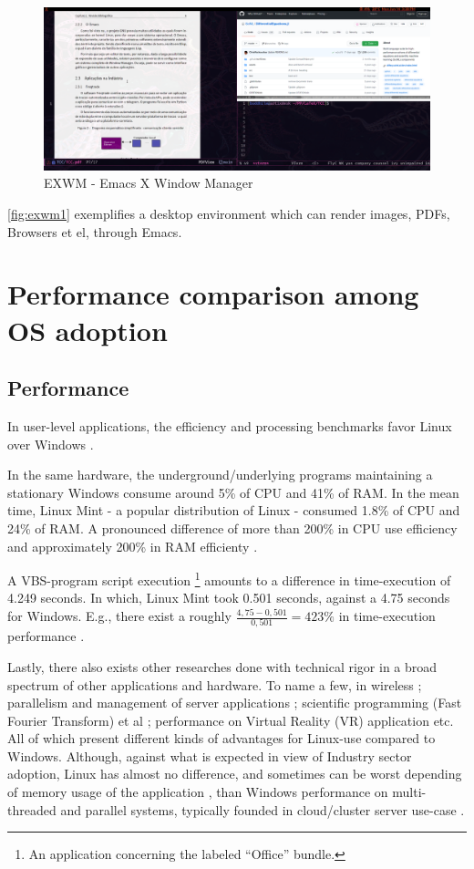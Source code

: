 \documentclass[
12pt,				%
openright,			%
oneside,			%
a4paper,			%
brazil,				%
english,			  %
]{abntex2}
\begin{document}
\begin{figure}[ht]
  \centering
  \caption{\label{fig:exwm1} EXWM - Emacs X Window Manager}
  \includegraphics[width=\linewidth]{exwm2.png}
\end{figure}

\autoref{fig:exwm1} exemplifies a desktop environment which can render
images, PDFs, Browsers et el, through Emacs. 

\section{Performance comparison among OS adoption}

\subsection{Performance}
In user-level applications, the efficiency and processing benchmarks
favor Linux over Windows \cite{sulaiman2021comparison}.

In the same hardware, the underground/underlying programs maintaining
a stationary Windows consume around 5\% of CPU and 41\% of RAM. In the
mean time, Linux Mint - a popular distribution of Linux - consumed
1.8\% of CPU and 24\% of RAM. A pronounced difference of more than
200\% in CPU use efficiency and approximately 200\% in RAM efficienty \cite{sulaiman2021comparison}. 

A VBS-program script execution \footnote{An application concerning the
  labeled ``Office'' bundle.} amounts to a difference in
time-execution of 4.249 seconds. In which, Linux
Mint took 0.501 seconds, against a 4.75 seconds for Windows. E.g.,
there exist a roughly $\frac{4,75-0,501}{0,501}= 423\%$ in
time-execution performance \cite{sulaiman2021comparison}.

Lastly, there also exists other researches done with technical rigor in a
broad spectrum of other applications and hardware. To name a few, in
wireless \cite{SDevan2013WINDOWS8V}; parallelism and management of
server applications \cite{aveleda2010performance}; scientific programming (Fast Fourier Transform) et al
\cite{d2011performance}; performance on Virtual Reality (VR)
application \cite{thubaasini2010efficient} etc. All of which present
different kinds of advantages for Linux-use compared to
Windows. Although, against what is expected in view of Industry sector
adoption, Linux has almost no difference, and sometimes can be worst
depending of memory usage of the application \cite{ristov2013}, than Windows performance on
multi-threaded and parallel systems, typically founded in cloud/cluster
server use-case \cite{aveleda2010performance}.
\end{document}
